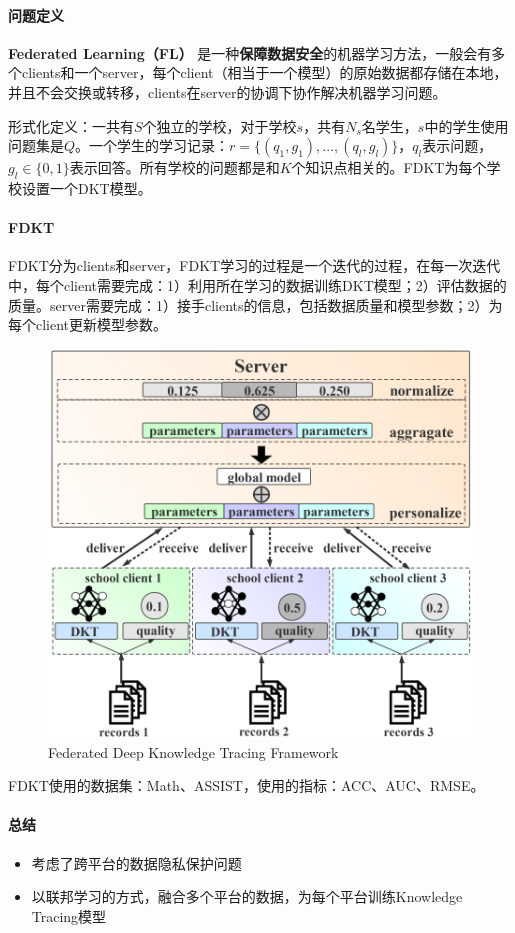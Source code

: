 \paragraph{问题定义}
\par{\textbf{Federated Learning（FL）}} 是一种\textbf{保障数据安全}的机器学习方法，一般会有多个clients和一个server，每个client（相当于一个模型）的原始数据都存储在本地，并且不会交换或转移，clients在server的协调下协作解决机器学习问题。

形式化定义：一共有$S$个独立的学校，对于学校$s$，共有$N_s$名学生，$s$中的学生使用问题集是$Q$。一个学生的学习记录：$r = \{(q_1, g_1), ..., (q_l, g_l)\}$，$q_l$表示问题，$g_l \in \{0, 1\}$表示回答。所有学校的问题都是和$K$个知识点相关的。FDKT为每个学校设置一个DKT模型。

\paragraph{FDKT}
FDKT分为clients和server，FDKT学习的过程是一个迭代的过程，在每一次迭代中，每个client需要完成：1）利用所在学习的数据训练DKT模型；2）评估数据的质量。server需要完成：1）接手clients的信息，包括数据质量和模型参数；2）为每个client更新模型参数。


\begin{figure}[h]
	\centering
	\includegraphics[width=.5\textwidth]{pics/fdkt.png}
	\caption{Federated Deep Knowledge Tracing Framework}
	\label{fig:fdkt}
\end{figure}

FDKT使用的数据集：Math、ASSIST，使用的指标：ACC、AUC、RMSE。

\paragraph{总结}

\begin{itemize}
	\item 考虑了跨平台的数据隐私保护问题
	\item 以联邦学习的方式，融合多个平台的数据，为每个平台训练Knowledge Tracing模型
	
\end{itemize}

